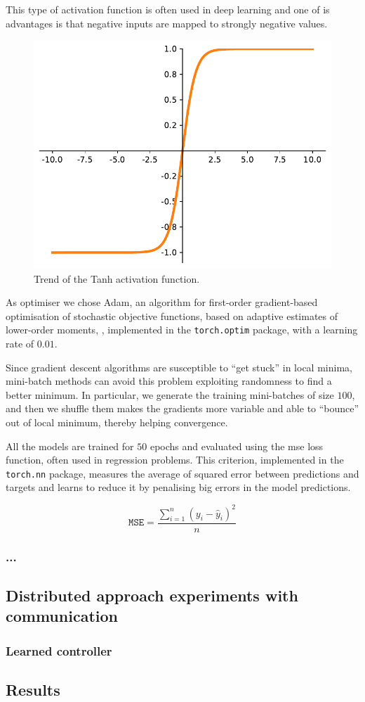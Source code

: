 This type of activation function is often used in deep learning and one of is 
advantages is that negative inputs are mapped to strongly negative values.

\begin{figure}[htb]
	\centering
	\includegraphics[width=.5\textwidth]{contents/images/tanh2}%
	\caption{Trend of the Tanh activation function.}
	\label{fig:tanh}
\end{figure}

As optimiser we chose Adam, {an algorithm for first-order gradient-based 
optimisation of stochastic objective functions, based on adaptive estimates of 
lower-order moments}, \cite[see][]{kingma2014adam, 
loshchilov2017decoupled}, 
implemented in the \texttt{torch.optim} package, with a learning rate of $0.01$. 

Since gradient descent algorithms are susceptible to ``get stuck'' in local minima,
mini-batch methods can avoid this problem exploiting randomness to find a 
better minimum.
In particular, we generate the training mini-batches of size $100$, and then we 
shuffle them makes the gradients more variable and able to ``bounce'' out of 
local minimum, thereby helping convergence.

All the models are trained for $50$ epochs and evaluated using the \gls{mse} loss 
function, often used in regression problems. 
This criterion, implemented in the \texttt{torch.nn} package, measures the 
average of squared error between predictions and targets and learns to reduce it 
by penalising big errors in the model predictions.

\begin{Equation}[H]
	\centering
	\begin{equation}
	\mathtt{MSE} = \frac{\sum_{i=1}^n (y_i-\hat y_i)^2}{n}
	\end{equation}
	\caption{Mean Squared Error (\gls{mse}) loss function.}
	\label{eq:mse}
\end{Equation}
	
\subsubsection{...}
\label{subsubsec:....}


\subsection{Distributed approach experiments with communication}
\label{subsec:ex1comm}


\subsubsection{Learned controller}
\label{subsubsec:learnedcomm}
\subsection{Results}
\label{subsec:results1}

